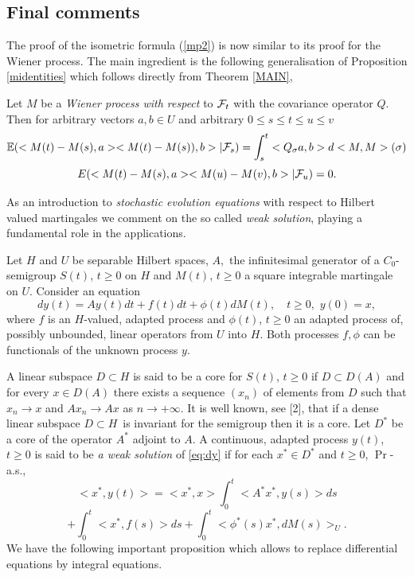 \documentclass[preprint]{imsart}
\def\E{\mathbb E}
\begin{document}
{\subsection{Final comments}
The proof of the isometric formula (\ref{mp2}) is now similar to its proof for the Wiener process. The main
ingredient  is  the following generalisation of Proposition \ref{midentities} which follows directly from
Theorem \ref{MAIN},
\begin{Proposition}\label{midentities3}
Let $M$ be a {\it Wiener process with respect} to ${\cal F}_t$ with the covariance operator $Q$. Then
for arbitrary vectors $a, b \in U$ and arbitrary $0\leq s \leq t \leq u \leq v$
\begin{equation}
\E (<M(t)- M(s), a> <M(t)- M(s)), b> |{\cal F}_s) = \int_{s}^{t} <Q_{\sigma}a, b> d<M, M>(\sigma)
\end{equation}
\begin{equation}
E (<M(t)- M(s) , a> <M(u)- M(v), b> |{\cal F}_u)= 0.
\end{equation}
\end{Proposition}
\vspace{3mm}

\noindent As an introduction to {\it stochastic evolution equations} with respect to Hilbert valued
martingales we comment on the so called {\it weak solution}, playing a fundamental role in the applications.
\vspace{3mm}

\noindent Let $H$ and $U$ be separable Hilbert spaces, $A,$  the infinitesimal generator
of a $C_0$-semigroup $S(t)$, $t\geq 0$ on $H$ and $M(t)$, $t \geq0$ a square integrable
martingale on $U$.   Consider an
equation
\begin{equation} \label{eq:dy}
    dy(t) = Ay(t) dt + f(t) dt + \phi(t) dM(t), \quad t \geq 0,\,\,y(0) = x,
\end{equation}
where $f$ is an $H$-valued, adapted process and $\phi(t)$,
$t\geq0$ an adapted process of,
possibly unbounded, linear operators from $U$ into $H$. Both processes $f, \phi$ can be functionals of the unknown process $y$.

\noindent A linear subspace $D \subset H$ is said to be a core for $S(t)$, $t \geq 0$ if
$D \subset D(A)$ and for every $x\in D(A)$ there exists a sequence $(x_n)$ of
elements from $D$ such that $x_n \to x$ and $Ax_n \to Ax$ as $n \to +\infty$.
It is well known, see [2], that if a dense linear subspace $D \subset H\,$
is invariant for
the semigroup then it is a core.
Let $D^*$ be a core of the operator $A^*$ adjoint to $A$.  A continuous,
adapted process $y(t)$, $t\geq 0$ is said to be {\it a weak  solution} of
\ref{eq:dy} if for each $x^* \in D^*$ and $t \geq 0$, $\Pr$-a.s.,
\begin{equation}
    < x^*, y(t) > =
    < x^*, x >
    \int_0^t < A^*x^*, y(s) > ds
\end{equation}
\begin{equation}
    +\int_0^t < x^*, f(s) > ds +
    \int_0^t < \phi^*(s)x^*, dM(s) >_U.
\end{equation}
We have the following important proposition which allows to replace differential equations by integral
equations.

}
\end{document}
